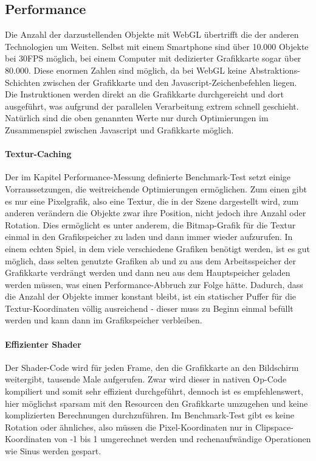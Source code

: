 \documentclass[a4paper, 12pt]{article}
\begin{document}
\subsection{Performance}
Die Anzahl der darzustellenden Objekte mit WebGL übertrifft die der anderen Technologien um Weiten. Selbst mit einem Smartphone sind über 10.000 Objekte bei 30FPS möglich, bei einem Computer mit dedizierter Grafikkarte sogar über 80.000. Diese enormen Zahlen sind möglich, da bei WebGL keine Abstraktions-Schichten zwischen der Grafikkarte und den Javascript-Zeichenbefehlen liegen. Die Instruktionen werden direkt an die Grafikkarte durchgereicht und dort ausgeführt, was aufgrund der parallelen Verarbeitung extrem schnell geschieht. Natürlich sind die oben genannten Werte nur durch Optimierungen im Zusammenspiel zwischen Javascript und Grafikkarte möglich.
\paragraph{Textur-Caching} Der im Kapitel Performance-Messung definierte Benchmark-Test setzt einige Vorraussetzungen, die weitreichende Optimierungen ermöglichen. Zum einen gibt es nur eine Pixelgrafik, also eine Textur, die in der Szene dargestellt wird, zum anderen verändern die Objekte zwar ihre Position, nicht jedoch ihre Anzahl oder Rotation. Dies ermöglicht es unter anderem, die Bitmap-Grafik für die Textur einmal in den Grafikspeicher zu laden und dann immer wieder aufzurufen. In einem echten Spiel, in dem viele verschiedene Grafiken benötigt werden, ist es gut möglich, dass selten genutzte Grafiken ab und zu aus dem Arbeitsspeicher der Grafikkarte verdrängt werden und dann neu aus dem Hauptspeicher geladen werden müssen, was einen Performance-Abbruch zur Folge hätte.
Dadurch, dass die Anzahl der Objekte immer konstant bleibt, ist ein statischer Puffer für die Textur-Koordinaten völlig ausreichend - dieser muss zu Beginn einmal befüllt werden und kann dann im Grafikspeicher verbleiben.\cite{WebGLPerformance}
\paragraph{Effizienter Shader} Der Shader-Code wird für jeden Frame, den die Grafikkarte an den Bildschirm weitergibt, tausende Male aufgerufen. Zwar wird dieser in nativen Op-Code kompiliert und somit sehr effizient durchgeführt, dennoch ist es empfehlenswert, hier möglichst sparsam mit den Resourcen den Grafikkarte umzugehen und keine komplizierten Berechnungen durchzuführen. Im Benchmark-Test gibt es keine Rotation oder ähnliches, also müssen die Pixel-Koordinaten nur in Clipspace-Koordinaten von -1 bis 1 umgerechnet werden und rechenaufwändige Operationen wie Sinus werden gespart.
\end{document}
